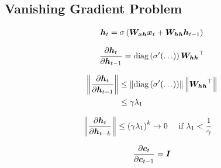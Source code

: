\subsection{Vanishing Gradient Problem}
\begin{align}
\MB{h}_t = \sigma \open{
\MB{W_{xh}}\MB{x}_t + \MB{W_{hh}}\MB{h}_{t-1}
}
\end{align}

\begin{align}
\fracder{\MB{h}_t}{\MB{h}_{t-1}} = \diag\open{\sigma'(\ldots)}\tp{\MB{W_{hh}}}
\end{align}

\begin{align}
\norm{\fracder{\MB{h}_t}{\MB{h}_{t-1}}} & \leq \norm{\diag\open{\sigma'(\ldots)}} 
\norm{\tp{\MB{W_{hh}}}} \\ 
& \leq \gamma \lambda_1
\end{align}

\begin{align}
\norm{\fracder{\MB{h}_t}{\MB{h}_{t-k}}} \leq \open{\gamma \lambda_1}^{k}
\rightarrow 0 & \quad \text{ if } \lambda_1 < \frac{1}{\gamma}
\end{align}

\begin{align}
\fracder{\MB{c}_t}{\MB{c}_{t-1}} = \MB{I}
\end{align}

